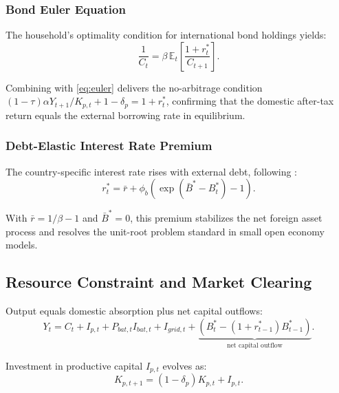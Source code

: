 	\subsubsection{Bond Euler Equation}

	The household's optimality condition for international bond holdings yields:
	\begin{equation}
		\frac{1}{C_t} = \beta \, \mathbb{E}_t \left[ \frac{1 + r^*_t}{C_{t+1}} \right]
		\label{eq:bond_euler}.
	\end{equation}

	Combining with \eqref{eq:euler} delivers the no-arbitrage condition $(1-\tau)\alpha Y_{t+1}/K_{p,t} + 1 - \delta_p = 1 + r^*_t$, confirming that the domestic after-tax return equals the external borrowing rate in equilibrium.
	
	\subsubsection{Debt-Elastic Interest Rate Premium}

	The country-specific interest rate rises with external debt, following \citet{schmittgrohe2003}:
	\begin{equation}
		r^*_t = \bar{r} + \phi_b \left( \exp(\bar{B}^* - B^*_t) - 1 \right)
		\label{eq:interest_premium}.
	\end{equation}

	With $\bar{r} = 1/\beta - 1$ and $\bar{B}^* = 0$, this premium stabilizes the net foreign asset process and resolves the unit-root problem standard in small open economy models.
	
	\subsection{Resource Constraint and Market Clearing}
	
	Output equals domestic absorption plus net capital outflows:
	\begin{equation}
		Y_t = C_t + I_{p,t} + P_{bat,t} I_{bat,t} + I_{grid,t} + \underbrace{(B^*_t - (1+r^*_{t-1})B^*_{t-1})}_{\text{net capital outflow}}
		\label{eq:goods_market_clearing}.
	\end{equation}
	
	\noindent Investment in productive capital $I_{p,t}$ evolves as:
	\begin{equation}
		K_{p,t+1} = (1-\delta_p) K_{p,t} + I_{p,t}
		\label{eq:productive_capital}.
	\end{equation}
	
